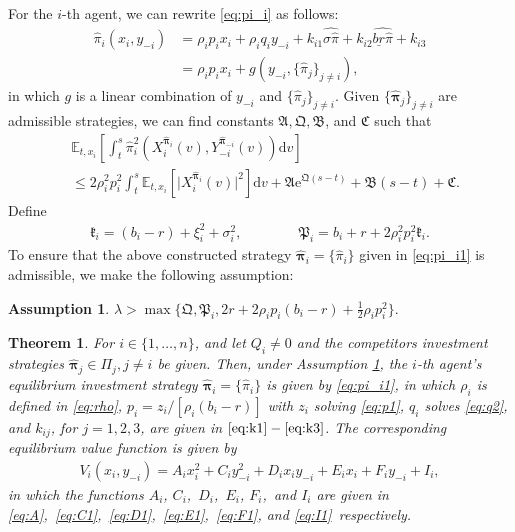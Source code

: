 \documentclass[11pt]{article}
\newtheorem{theorem}{Theorem}[section]
\newtheorem{assumption}{Assumption}[section]
\newcommand \drm {\mathrm{d}}
\newcommand \E {\mathbb{E}}
\newcommand \la {\lambda}
\newcommand \e {\mathrm{e}}
\newenvironment{bluepar}
{\begingroup\color{blue}}
{\endgroup}
\numberwithin{equation}{section}
\newcommand{\bpi}{\boldsymbol{\pi}}
\providecommand{\smn}{{-}} %
\begin{document}
\begin{bluepar}	
For the $i$-th agent, we can rewrite \eqref{eq:pi_i} as follows:
\begin{align}
		\widehat{\pi}_i(x_i, y_{\smn i}) &= \rho_i p_i x_i + \rho_i q_i y_{\smn i} + k_{i1} \widehat{\sigma\widehat{\pi}} + k_{i2}\widehat{\underline{br}\widehat{\pi}}+k_{i3} \\
		&= \rho_i p_i x_i + g(y_{\smn i}, \{\widehat{\pi}_j\}_{j \neq i}),  \label{eq:pi_i1}
\end{align}
in which $g$ is a linear combination of $y_{\smn i}$ and $\{\widehat{\pi}_j\}_{j \neq i}$. Given $\{\widehat{\bm{\pi}}_j\}_{j\neq i}$ are admissible strategies, we can find constants $\mathfrak{A}, \mathfrak{Q}, \mathfrak{B}$, and $\mathfrak{C}$ such that
\begin{align}\label{eq:up_bound_X}
&\E_{t, x_i}\left[\int_t^s \widehat{\pi}_i^2\left(X_i^{\widehat{\bm{\pi}}_i}(v), Y^{\widehat{\bpi}_{\smn i}}_{\smn i}(v)\right)\drm v \right] \\
&\le 2\rho^2_i p^2_i \int_t^s \E_{t, x_i}[\lvert  X^{\widehat{\bpi}_i}_i(v) \rvert^2]\drm v
+ \mathfrak{A}\e^{\mathfrak{Q}(s-t)} + \mathfrak{B}(s-t)+\mathfrak{C}.
\end{align}
Define
\begin{align}\label{eq:fkp}
\mathfrak{k}_i = (b_i - r) + \xi_i^2 + \sigma_i^2, \qquad \qquad
\mathfrak{P}_i = b_i+r + 2\rho^2_i p^2_i \mathfrak{k}_i.
\end{align}
To ensure that the above constructed strategy $\widehat{\bpi}_i = \{\widehat{\pi}_i\}$ given in \eqref{eq:pi_i1} is admissible, we make the following assumption:
\begin{assumption}\label{assum:1a}
$\la > \max\{\mathfrak{Q},\mathfrak{P}_i, 2r+2\rho_i p_i(b_i-r)+\frac{1}{2}\rho_i p^2_i\}.$
\end{assumption}
\end{bluepar}
\begin{theorem}\label{th:main}
For $i \in \{1, \ldots, n\}$, and let $Q_i \neq 0$ and the competitors investment strategies $\widehat{\bm{\pi}}_j \in \Pi_j, j\neq i$ be given. Then, under Assumption \ref{assum:1a},
 the $i$-th agent's equilibrium investment strategy $\widehat{\bm{\pi}}_i = \{\widehat{\pi}_i\}$ is given by
 \eqref{eq:pi_i1},
 in which \(\rho_i\) is defined in \eqref{eq:rho}, \(p_i=z_i/[\rho_i(b_i-r)]\) with \(z_i\) solving \eqref{eq:p1}, \(q_i\) solves \eqref{eq:q2}, and \(k_{ij}\), for \(j=1,2,3\), are given in \(\eqref{eq:k1}-\eqref{eq:k3}\).
The corresponding equilibrium value function is given by
\begin{align}\label{eq:VV}
V_i( x_i,y_{\smn i})=A_i x_i^2+C_i y_{\smn i}^2+D_i x_iy_{\smn i}+E_i x_i+F_i y_{\smn i}+I_i,
\end{align}
in which the functions $A_i $, $C_i $,\ $D_i$,\ $E_i $, \(F_i\),\ and $I_i $ are given in \eqref{eq:A},\ \eqref{eq:C1},\ \eqref{eq:D1},\ \eqref{eq:E1},\ \eqref{eq:F1}, and \eqref{eq:I1}\ respectively.
\end{theorem}
\end{document}
